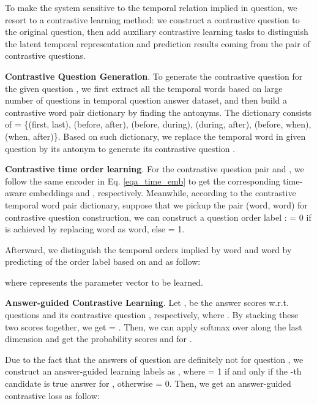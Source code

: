 \documentclass[11pt]{article}
\newcommand{\xhdr}[1]{{\noindent\bfseries #1}.}
\begin{document}
To make the system sensitive to the temporal relation implied in question, we resort to a contrastive learning method: we construct a contrastive question to the original question, then add auxiliary contrastive learning tasks to distinguish the latent temporal representation and prediction results coming from the pair of contrastive questions.




\xhdr{Contrastive Question Generation} To generate the contrastive question  for the given question , we first extract all the temporal words based on large number of questions in temporal question answer dataset, and then build a contrastive word pair dictionary by finding the antonyms. The dictionary consists of  = \{(first, last), (before, after), (before, during), (during, after), (before, when), (when, after)\}. Based on such dictionary, we replace the temporal word in given question  by its antonym to generate its contrastive question .










\xhdr{Contrastive time order learning} For the contrastive question pair  and , we follow the same encoder in Eq. \ref{eqa_time_emb} to get the corresponding time-aware embeddings  and , respectively. Meanwhile, according to the contrastive temporal word pair dictionary, suppose that we pickup the pair (word, word)  for contrastive question construction, we can construct a question order label :  = 0 if  is achieved by replacing word as word, else  = 1.

Afterward, we distinguish the temporal orders implied by word and word by predicting of the order label  based on  and  as follow:

where  represents the parameter vector to be learned.







\xhdr{Answer-guided Contrastive Learning} Let ,  be the answer scores w.r.t. questions  and its contrastive question , respectively, where . By stacking these two scores together, we get  = . Then, we can apply softmax over  along the last dimension and get the probability scores  and  for .




Due to the fact that the answers of question  are definitely not for question , we construct an answer-guided learning labels as , where  = 1 if and only if the -th candidate is true answer for , otherwise  = 0. Then, we get an answer-guided contrastive loss as follow:
\end{document}
